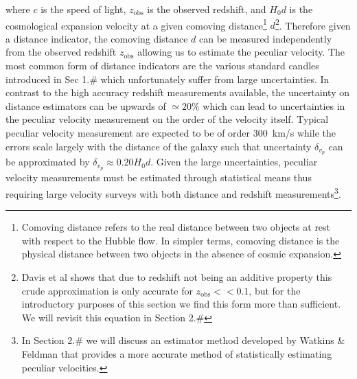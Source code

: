 \noindent where \(c\) is the speed of light, \(z_\text{obs}\) is the
observed redshift, and \(H_0d\) is the cosmological expansion velocity
at a given comoving
distance\footnote{Comoving distance refers to the real distance between two objects at rest with respect to the Hubble flow. In simpler terms, comoving distance is the physical distance between two objects in the absence of cosmic expansion.}
\(d\)\footnote{Davis et al shows that due to redshift not being an additive property this crude approximation is only accurate for $z_\text{obs} << 0.1$, but for the introductory purposes of this section we find this form more than sufficient. We will revisit this equation in Section 2.#}.
Therefore given a distance indicator, the comoving distance \(d\) can be
measured independently from the observed redshift \(z_\text{obs}\)
allowing us to estimate the peculiar velocity. The most common form of
distance indicators are the various standard candles introduced in Sec
1.\# which unfortunately suffer from large uncertainties. In contrast to
the high accuracy redshift measurements available, the uncertainty on
distance estimators can be upwards of \(\simeq 20\%\) which can lead to
uncertainties in the peculiar velocity measurement on the order of the
velocity itself. Typical peculiar velocity measurement are expected to
be of order \SI{300}{km/s} while the errors scale largely with the
distance of the galaxy such that uncertainty \(\delta_{v_p}\) can be
approximated by \(\delta_{v_p} \approx 0.20 H_0 d\). Given the large
uncertainties, peculiar velocity measurements must be estimated through
statistical means thus requiring large velocity surveys with both
distance and redshift
measurements\footnote{In Section 2.# we will discuss an estimator method developed by Watkins & Feldman that provides a more accurate method of statistically estimating peculiar velocities.}.
